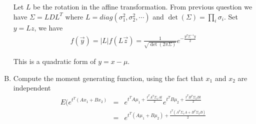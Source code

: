 \documentclass{article}
\begin{document}
\begin{enumerate}[(A)]
Let $L$ be the rotation in the affine transformation. From previous question we have $\Sigma=LDL^T$  where $L=diag(\sigma_1^2,\sigma_2^2,\cdots)$ and $\det(\Sigma)=\prod_i\sigma_i$. Set $y=Lz$, we have
\begin{eqnarray}
f(\vec{y})=|L|f(L\vec{z})=\frac{1}{\sqrt{\det(2\pi\Sigma)}}e^{-\frac{y^T\Sigma^{-1}y}{2}}
\end{eqnarray}

This is a quadratic form of $y=x-\mu$.

\item

Compute the moment generating function, using the fact that $x_1$ and $x_2$ are independent
\begin{eqnarray}
E(e^{t^T(Ax_1+Bx_2)}&=&e^{t^TA\mu_1+\frac{t^TA^T\Sigma_1 At}{2}}e^{t^TB\mu_2+\frac{t^TB^T\Sigma_2Bt}{2}}\nonumber\\
&=&e^{t^T(A\mu_1+B\mu_2)+\frac{t^T(A^T\Sigma_1 A+B^T\Sigma_2B)}{2}}
\end{eqnarray}

\end{enumerate}
\end{document}
